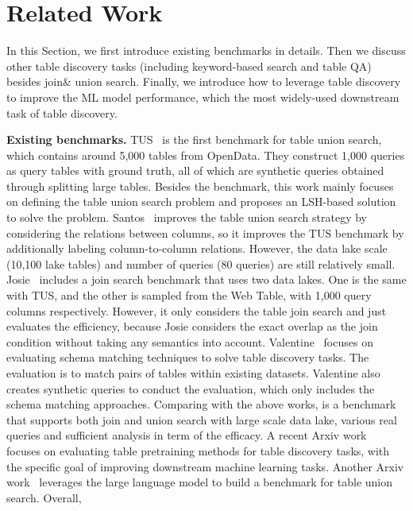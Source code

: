 \section{Related Work}
In this Section, we first introduce existing  benchmarks in details. Then we discuss other table discovery tasks  (including keyword-based search and table QA) besides join\& union search. Finally, we introduce how to leverage table discovery to improve the ML model performance, which the most widely-used downstream task of table discovery. 



\noindent \textbf{Existing benchmarks.} 
TUS~\cite{TUS} is the first benchmark for table union search, which contains around 5,000 tables from OpenData. They construct 1,000 queries  as query tables with ground truth, all of which are synthetic queries obtained through splitting large tables. Besides the benchmark, this work mainly focuses on defining the table union search problem and proposes an LSH-based  solution to solve the problem.
%
Santos~\cite{Santos} improves the table union search strategy by considering the relations between columns, so it improves the  TUS benchmark by additionally labeling column-to-column relations. However, the data lake scale (10,100  lake tables) and number of queries (80 queries) are still relatively small. 
%
Josie~\cite{Josie} includes a join search benchmark that uses two data lakes. One is the same with TUS, and the other is sampled from the Web Table, with 1,000 query columns respectively. However, it only considers the table join search and just evaluates the efficiency, because Josie  considers the exact overlap as the join condition without taking any semantics into account. 
%
Valentine~\cite{valentine} focuses on evaluating  schema matching techniques to solve table discovery tasks. The evaluation is to match pairs of tables within  existing datasets.   Valentine also creates synthetic queries to conduct the evaluation, which only includes the schema matching approaches.
%
Comparing with the above works, \sys is a benchmark that supports both join and union search with large scale data lake, various real queries and sufficient analysis in term of the efficacy.  
%
A recent Arxiv work~\cite{arxiv} focuses on evaluating table pretraining methods for table
 discovery tasks, with the specific goal of improving downstream machine learning tasks. 
%
Another Arxiv work~\cite{arxiv} leverages the large language model to build a benchmark for table union search.
%
Overall, \sys

